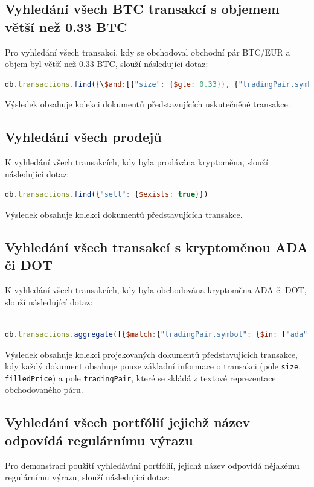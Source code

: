 \documentclass[12pt, a4paper]{article}
\begin{document}
\subsection{Vyhledání všech BTC transakcí s objemem větší než 0.33 BTC}
Pro vyhledání všech transakcí, kdy se obchodoval obchodní pár BTC/EUR a objem byl větší než 0.33 BTC, slouží následující dotaz:

\begin{lstlisting}[language=JavaScript]
db.transactions.find({\$and:[{"size": {$gte: 0.33}}, {"tradingPair.symbol": "btc"}, {"tradingPair.currency": "eur"}]})

\end{lstlisting}
Výsledek obsahuje kolekci dokumentů představujících uskutečněné transakce.

\subsection{Vyhledání všech prodejů}
K vyhledání všech transakcích, kdy byla prodávána kryptoměna, slouží následující dotaz:

\begin{lstlisting}[language=JavaScript]
db.transactions.find({"sell": {$exists: true}})
\end{lstlisting}
Výsledek obsahuje kolekci dokumentů představujících transakce.


\subsection{Vyhledání všech transakcí s kryptoměnou ADA či DOT}
K vyhledání všech transakcích, kdy byla obchodována kryptoměna ADA či DOT, slouží následující dotaz:

\begin{lstlisting}[language=JavaScript]

db.transactions.aggregate([{$match:{"tradingPair.symbol": {$in: ["ada", "dot"]}}}, {$project: {"size": 1, "filledPrice": 1, "tradingPair": {$concat:["$tradingPair.symbol", "/", "$tradingPair.currency"]}}}])

\end{lstlisting}

Výsledek obsahuje kolekci projekovaných dokumentů představujících transakce, kdy každý dokument obsahuje pouze základní informace o transakci (pole \texttt{size}, \texttt{filledPrice}) a pole \texttt{tradingPair}, které se skládá z textové reprezentace obchodovaného páru.


\subsection{Vyhledání všech portfólií jejichž název odpovídá regulárnímu výrazu}
Pro demonstraci použití vyhledávání portfólií, jejichž název odpovídá nějakému regulárnímu výrazu, slouží následující dotaz:
\end{document}
